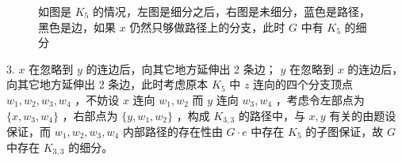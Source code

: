 \documentclass[11pt, a4paper]{ctexart}
\begin{document}
\begin{figure}[H]
    \caption{如图是 $K_5$ 的情况，左图是细分之后，右图是未细分，蓝色是路径，黑色是边，如果 $x$ 仍然只够做路径上的分支，此时 $G$ 中有 $K_5$ 的细分}
\end{figure}

3. $x$ 在忽略到 $y$ 的连边后，向其它地方延伸出 2 条边； $y$ 在忽略到 $x$ 的连边后，向其它地方延伸出 2 条边，此时考虑原本 $K_5$ 中 $z$ 连向的四个分支顶点 $w_1,w_2,w_3,w_4$ ，不妨设 $x$ 连向 $w_1,w_2$ 而 $y$ 连向 $w_3,w_4$ ，考虑令左部点为 $\{x,w_3,w_4\}$ ，右部点为 $\{y,w_1,w_2\}$ ，构成 $K_{3,3}$ 的路径中，与 $x,y$ 有关的由题设保证，而 $w_1,w_2,w_3,w_4$ 内部路径的存在性由 $G\cdot e$ 中存在 $K_5$ 的子图保证，故 $G$ 中存在 $K_{3,3}$ 的细分。
\end{document}
